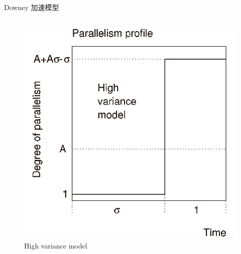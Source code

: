 \begin{frame}{Downey 加速模型}
\begin{columns}
        \begin{figure}
            \centering
            \includegraphics[scale=0.15]{pics/high_variance_model.png}
            \caption{High variance model}
        \end{figure}

    \end{columns}

\end{frame}

